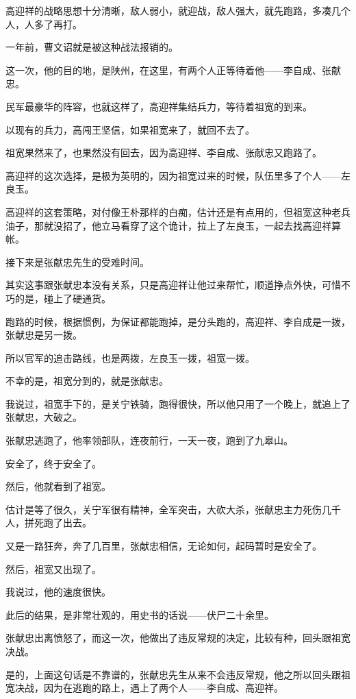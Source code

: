 \begin{multicols}{\theparacolNo}
		高迎祥的战略思想十分清晰，敌人弱小，就迎战，敌人强大，就先跑路，多凑几个人，人多了再打。

		一年前，曹文诏就是被这种战法报销的。

		这一次，他的目的地，是陕州，在这里，有两个人正等待着他——李自成、张献忠。

		民军最豪华的阵容，也就这样了，高迎祥集结兵力，等待着祖宽的到来。

		以现有的兵力，高闯王坚信，如果祖宽来了，就回不去了。

		祖宽果然来了，也果然没有回去，因为高迎祥、李自成、张献忠又跑路了。

		高迎祥的这次选择，是极为英明的，因为祖宽过来的时候，队伍里多了个人——左良玉。

		高迎祥的这套策略，对付像王朴那样的白痴，估计还是有点用的，但祖宽这种老兵油子，那就没招了，他立马看穿了这个诡计，拉上了左良玉，一起去找高迎祥算帐。

		接下来是张献忠先生的受难时间。

		其实这事跟张献忠本没有关系，只是高迎祥让他过来帮忙，顺道挣点外快，可惜不巧的是，碰上了硬通货。

		跑路的时候，根据惯例，为保证都能跑掉，是分头跑的，高迎祥、李自成是一拨，张献忠是另一拨。

		所以官军的追击路线，也是两拨，左良玉一拨，祖宽一拨。

		不幸的是，祖宽分到的，就是张献忠。

		我说过，祖宽手下的，是关宁铁骑，跑得很快，所以他只用了一个晚上，就追上了张献忠，大破之。

		张献忠逃跑了，他率领部队，连夜前行，一天一夜，跑到了九皋山。

		安全了，终于安全了。

		然后，他就看到了祖宽。

		估计是等了很久，关宁军很有精神，全军突击，大砍大杀，张献忠主力死伤几千人，拼死跑了出去。

		又是一路狂奔，奔了几百里，张献忠相信，无论如何，起码暂时是安全了。

		然后，祖宽又出现了。

		我说过，他的速度很快。

		此后的结果，是非常壮观的，用史书的话说——伏尸二十余里。

		张献忠出离愤怒了，而这一次，他做出了违反常规的决定，比较有种，回头跟祖宽决战。

		是的，上面这句话是不靠谱的，张献忠先生从来不会违反常规，他之所以回头跟祖宽决战，因为在逃跑的路上，遇上了两个人——李自成、高迎祥。


\end{multicols}
